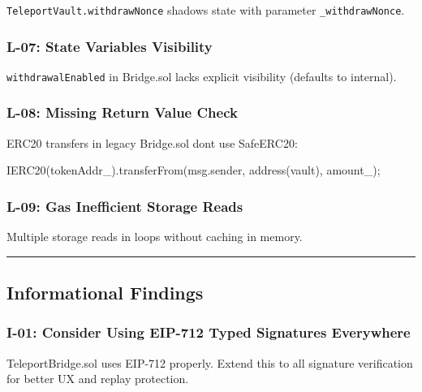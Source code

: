 \documentclass[
]{article}
\newenvironment{Shaded}{}{}
\newcommand{\NormalTok}[1]{#1}
\begin{document}
\texttt{TeleportVault.withdrawNonce} shadows state with parameter
\texttt{\_withdrawNonce}.

\subsubsection{L-07: State Variables
Visibility}\label{l-07-state-variables-visibility}

\texttt{withdrawalEnabled} in Bridge.sol lacks explicit visibility
(defaults to internal).

\subsubsection{L-08: Missing Return Value
Check}\label{l-08-missing-return-value-check}

ERC20 transfers in legacy Bridge.sol don\textquotesingle t use
SafeERC20:

\begin{Shaded}
\begin{Highlighting}[]
\NormalTok{IERC20(tokenAddr\_).transferFrom(msg.sender, address(vault), amount\_);}
\end{Highlighting}
\end{Shaded}

\subsubsection{L-09: Gas Inefficient Storage
Reads}\label{l-09-gas-inefficient-storage-reads}

Multiple storage reads in loops without caching in memory.

\begin{center}\rule{0.5\linewidth}{0.5pt}\end{center}

\subsection{Informational Findings}\label{informational-findings}

\subsubsection{I-01: Consider Using EIP-712 Typed Signatures
Everywhere}\label{i-01-consider-using-eip-712-typed-signatures-everywhere}

TeleportBridge.sol uses EIP-712 properly. Extend this to all signature
verification for better UX and replay protection.
\end{document}
